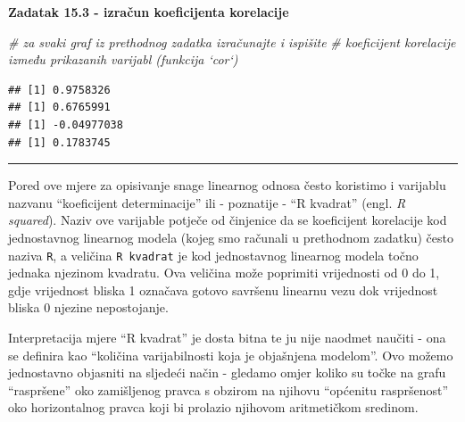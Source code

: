 \documentclass[]{book}
\newenvironment{Shaded}{\begin{snugshade}}{\end{snugshade}}
\newcommand{\KeywordTok}[1]{\textcolor[rgb]{0.13,0.29,0.53}{\textbf{#1}}}
\newcommand{\CommentTok}[1]{\textcolor[rgb]{0.56,0.35,0.01}{\textit{#1}}}
\newcommand{\OperatorTok}[1]{\textcolor[rgb]{0.81,0.36,0.00}{\textbf{#1}}}
\newcommand{\NormalTok}[1]{#1}
\theoremstyle{definition}
\theoremstyle{definition}
\theoremstyle{definition}
\theoremstyle{remark}
\begin{document}
\textbf{Zadatak 15.3 - izračun koeficijenta korelacije}

\begin{Shaded}
\begin{Highlighting}[]
\CommentTok{# za svaki graf iz prethodnog zadatka izračunajte i ispišite}
\CommentTok{# koeficijent korelacije između prikazanih varijabl (funkcija `cor`)}
\end{Highlighting}
\end{Shaded}

\begin{Shaded}
\end{Shaded}

\begin{verbatim}
## [1] 0.9758326
## [1] 0.6765991
## [1] -0.04977038
## [1] 0.1783745
\end{verbatim}

\begin{center}\rule{0.5\linewidth}{\linethickness}\end{center}

Pored ove mjere za opisivanje snage linearnog odnosa često koristimo i
varijablu nazvanu ``koeficijent determinacije'' ili - poznatije - ``R
kvadrat'' (engl. \emph{R squared}). Naziv ove varijable potječe od
činjenice da se koeficijent korelacije kod jednostavnog linearnog modela
(kojeg smo računali u prethodnom zadatku) često naziva \texttt{R}, a
veličina \texttt{R\ kvadrat} je kod jednostavnog linearnog modela točno
jednaka njezinom kvadratu. Ova veličina može poprimiti vrijednosti od 0
do 1, gdje vrijednost bliska 1 označava gotovo savršenu linearnu vezu
dok vrijednost bliska 0 njezine nepostojanje.

Interpretacija mjere ``R kvadrat'' je dosta bitna te ju nije naodmet
naučiti - ona se definira kao ``količina varijabilnosti koja je
objašnjena modelom''. Ovo možemo jednostavno objasniti na sljedeći način
- gledamo omjer koliko su točke na grafu ``raspršene'' oko zamišljenog
pravca s obzirom na njihovu ``općenitu raspršenost'' oko horizontalnog
pravca koji bi prolazio njihovom aritmetičkom sredinom.
\end{document}

